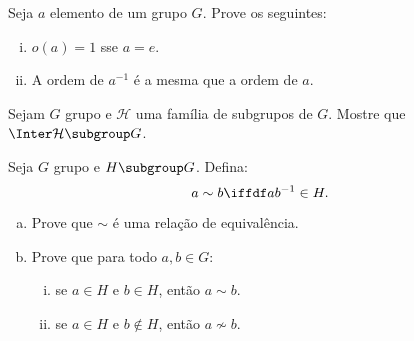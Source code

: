 \begin{exercise}
    Seja $a$ elemento de um grupo $G$. Prove os seguintes:

\begin{enumerate}[(i)]
    \item $o(a) = 1$ sse $a = e$.
    \item A ordem de $a^{-1}$ é a mesma que a ordem de $a$.
\end{enumerate}

\end{exercise}

\begin{exercise}
    Sejam $G$ grupo e $\mathcal H$ uma família de subgrupos de $G$. Mostre que $\Inter \mathcal H \subgroup G$.
\end{exercise}

\begin{exercise}
	Seja $G$ grupo e $H \subgroup G$. Defina:
	$$
		a \sim b \iffdf ab^{-1} \in H. 
	$$
	\begin{enumerate}[(a)]
		\item Prove que $\sim$ é uma relação de equivalência.
		\item Prove que para todo $a,b \in G$:
			\begin{enumerate}[(i)]
				\item se $a \in H$ e $b \in H$, então $a \sim b$.
				\item se $a \in H$ e $b \notin H$, então $a \not\sim b$.
			\end{enumerate}
	\end{enumerate}
\end{exercise}
